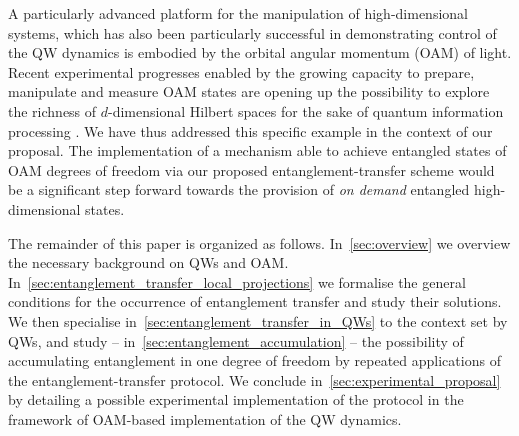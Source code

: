 \documentclass[
	aps, pra,
	superscriptaddress, twocolumn,
	floatfix,
	10pt
]{revtex4-1}
\newcommand{\parTitle}[1]{\noindent{\color{Mahogany}(\emph{#1})}}
\newcommand{\commale}[1]{{\textcolor{red} {\it{[Note (Ale): #1]}}}}
\renewcommand{\parTitle}[1]{}
\begin{document}
\parTitle{Recent experimental advances in HD entanglement with OAM} A particularly advanced platform for the manipulation of high-dimensional systems, which has also been particularly successful in demonstrating control of the QW dynamics is embodied by the orbital angular momentum (OAM) of light. Recent experimental progresses enabled by the growing capacity to prepare, manipulate and measure OAM states are opening up the possibility to explore the richness of $d$-dimensional Hilbert spaces for the sake of quantum information processing \cite{erhard2018twisted}. %
We have thus addressed this specific example in the context of our proposal. The implementation of a mechanism able to achieve entangled states of OAM degrees of freedom via our proposed entanglement-transfer scheme %
would be a significant step forward towards the provision of {\it on demand} entangled high-dimensional states. 



\parTitle{Tentative outline}
The remainder of this paper is organized as follows. In~\cref{sec:overview} we overview the necessary background on QWs and OAM.
In~\cref{sec:entanglement_transfer_local_projections} we formalise the general conditions for the occurrence of entanglement transfer and study their solutions. We then specialise in~\cref{sec:entanglement_transfer_in_QWs} to the context set by QWs, and study -- in~\cref{sec:entanglement_accumulation} -- the possibility of accumulating entanglement in one degree of freedom by repeated applications of the entanglement-transfer protocol.
We conclude in~\cref{sec:experimental_proposal} by detailing a possible experimental implementation of the protocol in the framework of OAM-based implementation of the QW dynamics.



\end{document}
